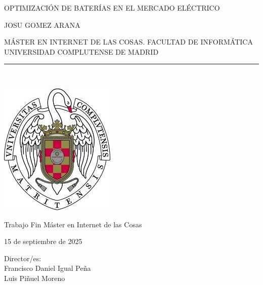 \newpage

\thispagestyle{empty}

\begin{center}

  \vspace{1cm}

  {\large OPTIMIZACIÓN DE BATERÍAS EN EL MERCADO ELÉCTRICO}\\

  \vspace{0.5cm}

  \vspace{0.5cm}

  {\large JOSU GOMEZ ARANA}\\

  \vspace{0.5cm}

  MÁSTER EN INTERNET DE LAS COSAS\@. FACULTAD DE INFORMÁTICA\\
  UNIVERSIDAD COMPLUTENSE DE MADRID\\

  \vspace{0.65cm}

  \rule{2in}{0.5pt}\\

  \vspace{0.85cm}

  \includegraphics[height=2.5in]{figures/escudo.jpg}

  \vspace{0.5cm}

  Trabajo Fin Máster en Internet de las Cosas

  \vspace{0.5cm}

  15 de septiembre de 2025\\

  \vspace{1cm}

\end{center}

{
  \raggedleft
  Director/es:\\
  \vspace{1cm}
  Francisco Daniel Igual Peña\\
  Luis Piñuel Moreno\\
}
